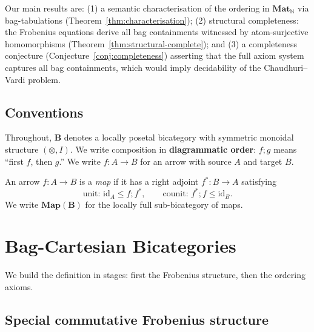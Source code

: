 \documentclass[11pt,a4paper]{article}
\theoremstyle{definition}
\newcommand{\Mat}{\mathbf{Mat}}
\newcommand{\Map}{\mathbf{Map}}
\newcommand{\N}{\mathbb{N}}
\newcommand{\id}{\mathrm{id}}
\begin{document}
Our main results are: (1) a semantic characterisation of the ordering in $\Mat_\N$ via bag-tabulations (Theorem~\ref{thm:characterisation}); (2) structural completeness: the Frobenius equations derive all bag containments witnessed by atom-surjective homomorphisms (Theorem~\ref{thm:structural-complete}); and (3) a completeness conjecture (Conjecture~\ref{conj:completeness}) asserting that the full axiom system captures all bag containments, which would imply decidability of the Chaudhuri--Vardi problem.

\subsection{Conventions}

Throughout, $\mathbf{B}$ denotes a locally posetal bicategory with symmetric monoidal structure $(\otimes, I)$. We write composition in \textbf{diagrammatic order}: $f;g$ means ``first $f$, then $g$.'' We write $f \colon A \to B$ for an arrow with source $A$ and target $B$.

An arrow $f \colon A \to B$ is a \emph{map} if it has a right adjoint $f^* \colon B \to A$ satisfying
\[
  \text{unit: } \id_A \leq f;f^*, \qquad
  \text{counit: } f^*;f \leq \id_B.
\]
We write $\Map(\mathbf{B})$ for the locally full sub-bicategory of maps.

\section{Bag-Cartesian Bicategories}
\label{sec:def}

We build the definition in stages: first the Frobenius structure, then the ordering axioms.

\subsection{Special commutative Frobenius structure}
\end{document}
